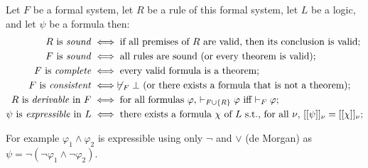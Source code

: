 \begin{definition}
Let $F$ be a formal system, let $R$ be a rule of this formal system, let $L$ be a logic, and let $\psi$ be a formula then:
    \begin{align*}
        \text{$R$ is \emph{sound}} &\iff \text{if all premises of $R$ are valid, then its conclusion is valid;} \\
        \text{$F$ is \emph{sound}} &\iff \text{all rules are sound (or every theorem is valid);} \\
        \text{$F$ is \emph{complete}} &\iff  \text{every valid formula is a theorem;} \\
        \text{$F$ is \emph{consistent}} &\iff  \not\vdash_F \bot \text{ (or there exists a formula that is not a theorem);}\\
        \text{$R$ is \emph{derivable} in $F$} &\iff \text{for all formulas $\varphi$, $\vdash_{F \cup \{R\}} \varphi$ iff $\vdash_F \varphi$}; \\  \text{$\psi$ is \emph{expressible} in $L$} &\iff \text{there exists a formula $\chi$ of $L$ s.t., for all $\nu$, $[[ \psi ]]_{\nu} = [[ \chi ]]_{\nu}$}; \\ 
    \end{align*}
\end{definition}

\begin{example}
    For example $\varphi_1 \wedge \varphi_2$ is expressible using only $\neg$ and $\vee$ (de Morgan) as $\psi = \neg(\neg\varphi_1 \wedge \neg\varphi_2)$.
\end{example}

